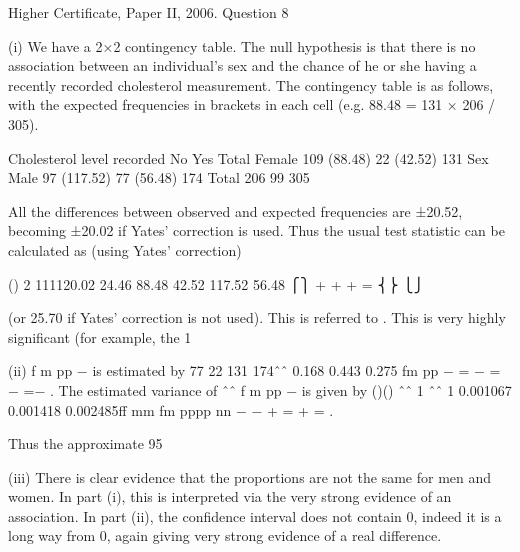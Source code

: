 \documentclass[a4paper,12pt]{article}
\begin{document}
Higher Certificate, Paper II, 2006.  Question 8 
 
 
(i) We have a 2×2 contingency table.  The null hypothesis is that there is no association between an individual's sex and the chance of he or she having a recently recorded cholesterol measurement.  The contingency table is as follows, with the expected frequencies in brackets in each cell (e.g. 88.48 = 131 × 206 / 305). 
 
  Cholesterol level recorded    No Yes Total Female 109     (88.48) 22  (42.52) 131    Sex Male   97   (117.52) 77  (56.48) 174  Total 206 99 305 
 
All the differences between observed and expected frequencies are ±20.52, becoming ±20.02 if Yates' correction is used.  Thus the usual test statistic can be calculated as (using Yates' correction) 
 
() 2 111120.02 24.46 88.48 42.52 117.52 56.48 ⎧⎫ + + + = ⎨⎬ ⎩⎭
 
 
(or 25.70 if Yates' correction is not used).  This is referred to .  This is very highly significant (for example, the 1%
 
 
(ii) f m pp − is estimated by 77 22 131 174ˆˆ 0.168 0.443 0.275 fm pp − = − = − =− .  The estimated variance of ˆˆ f m pp − is given by 
 ()() ˆˆ 1 ˆˆ 1 0.001067 0.001418 0.002485ff mm fm pppp nn − − + = + = . 
 
Thus the approximate 95%
 
 
(iii) There is clear evidence that the proportions are not the same for men and women.  In part (i), this is interpreted via the very strong evidence of an association.  In part (ii), the confidence interval does not contain 0, indeed it is a long way from 0, again giving very strong evidence of a real difference. 
\end{document}
